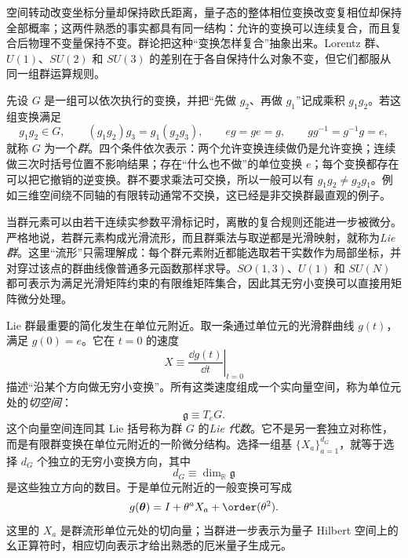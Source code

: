 空间转动改变坐标分量却保持欧氏距离，量子态的整体相位变换改变复相位却保持全部概率；这两件熟悉的事实都具有同一结构：允许的变换可以连续复合，而且复合后物理不变量保持不变。群论把这种“变换怎样复合”抽象出来。Lorentz 群、$U(1)$、$SU(2)$ 和 $SU(3)$ 的差别在于各自保持什么对象不变，但它们都服从同一组群运算规则。

先设 $G$ 是一组可以依次执行的变换，并把“先做 $g_2$、再做 $g_1$”记成乘积 $g_1g_2$。若这组变换满足
\begin{equation}
 g_1g_2\in G,\qquad
 (g_1g_2)g_3=g_1(g_2g_3),\qquad
 eg=ge=g,\qquad
 gg^{-1}=g^{-1}g=e,
 \label{eq:group-axioms-math-dp76}
\end{equation}
就称 $G$ 为一个\emph{群}。四个条件依次表示：两个允许变换连续做仍是允许变换；连续做三次时括号位置不影响结果；存在“什么也不做”的单位变换 $e$；每个变换都存在可以把它撤销的逆变换。群不要求乘法可交换，所以一般可以有 $g_1g_2\neq g_2g_1$。例如三维空间绕不同轴的有限转动通常不交换，这已经是非交换群最直观的例子。

当群元素可以由若干连续实参数平滑标记时，离散的复合规则还能进一步被微分。严格地说，若群元素构成光滑流形，而且群乘法与取逆都是光滑映射，就称为\emph{Lie 群}。这里“流形”只需理解成：每个群元素附近都能选取若干实数作为局部坐标，并对穿过该点的群曲线像普通多元函数那样求导。$SO(1,3)$、$U(1)$ 和 $SU(N)$ 都可表示为满足光滑矩阵约束的有限维矩阵集合，因此其无穷小变换可以直接用矩阵微分处理。

Lie 群最重要的简化发生在单位元附近。取一条通过单位元的光滑群曲线 $g(t)$，满足 $g(0)=e$。它在 $t=0$ 的速度
\begin{equation*}
 X\equiv\left.\frac{\dd g(t)}{\dd t}\right|_{t=0}
\end{equation*}
描述“沿某个方向做无穷小变换”。所有这类速度组成一个实向量空间，称为单位元处的\emph{切空间}：
\begin{equation}
 \boxed{\mathfrak g\equiv T_eG.}
 \label{eq:lie-algebra-tangent-general-dp68}
\end{equation}
这个向量空间连同其 Lie 括号称为群 $G$ 的\emph{Lie 代数}。它不是另一套独立对称性，而是有限群变换在单位元附近的一阶微分结构。选择一组基 $\{X_a\}_{a=1}^{d_G}$，就等于选择 $d_G$ 个独立的无穷小变换方向，其中
\begin{equation}
 d_G\equiv\dim_{\mathbb R}\mathfrak g
 \label{eq:lie-algebra-dimension-dp68}
\end{equation}
是这些独立方向的数目。于是单位元附近的一般变换可写成
\begin{equation}
 g(\boldsymbol\theta)
 =I+\theta^aX_a+\order(\theta^2).
 \label{eq:lie-infinitesimal-dp11}
\end{equation}
这里的 $X_a$ 是群流形单位元处的切向量；当群进一步表示为量子 Hilbert 空间上的幺正算符时，相应切向表示才给出熟悉的厄米量子生成元。

